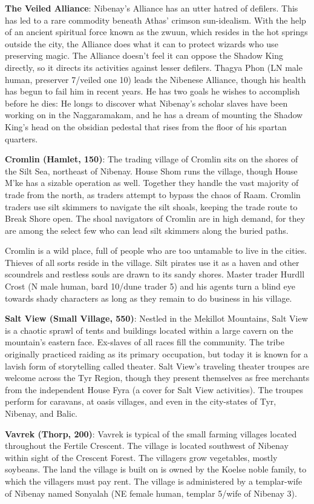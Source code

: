 {	\textbf{The Veiled Alliance}: Nibenay's Alliance has an utter hatred of defilers. This has led to a rare commodity beneath Athas' crimson sun-idealism. With the help of an ancient spiritual force known as the zwuun, which resides in the hot springs outside the city, the Alliance does what it can to protect wizards who use preserving magic. The Alliance doesn't feel it can oppose the Shadow King directly, so it directs its activities against lesser defilers. Thagya Phon (LN male human, preserver 7/veiled one 10) leads the Nibenese Alliance, though his health has begun to fail him in recent years. He has two goals he wishes to accomplish before he dies: He longs to discover what Nibenay's scholar slaves have been working on in the Naggaramakam, and he has a dream of mounting the Shadow King's head on the obsidian pedestal that rises from the floor of his spartan quarters.
}
{
	\textbf{Cromlin (Hamlet, 150)}: The trading village of Cromlin sits on the shores of the Silt Sea, northeast of Nibenay. House Shom runs the village, though House M'ke has a sizable operation as well. Together they handle the vast majority of trade from the north, as traders attempt to bypass the chaos of Raam. Cromlin traders use silt skimmers to navigate the silt shoals, keeping the trade route to Break Shore open. The shoal navigators of Cromlin are in high demand, for they are among the select few who can lead silt skimmers along the buried paths.

	Cromlin is a wild place, full of people who are too untamable to live in the cities. Thieves of all sorts reside in the village. Silt pirates use it as a haven and other scoundrels and restless souls are drawn to its sandy shores. Master trader Hurdll Crost (N male human, bard 10/dune trader 5) and his agents turn a blind eye towards shady characters as long as they remain to do business in his village.

	\textbf{Salt View (Small Village, 550)}: Nestled in the Mekillot Mountains, Salt View is a chaotic sprawl of tents and buildings located within a large cavern on the mountain's eastern face. Ex-slaves of all races fill the community. The tribe originally practiced raiding as its primary occupation, but today it is known for a lavish form of storytelling called theater. Salt View's traveling theater troupes are welcome across the Tyr Region, though they present themselves as free merchants from the independent House Fyra (a cover for Salt View activities). The troupes perform for caravans, at oasis villages, and even in the city-states of Tyr, Nibenay, and Balic.

	\textbf{Vavrek (Thorp, 200)}: Vavrek is typical of the small farming villages located throughout the Fertile Crescent. The village is located southwest of Nibenay within sight of the Crescent Forest. The villagers grow vegetables, mostly soybeans. The land the village is built on is owned by the Koelse noble family, to which the villagers must pay rent. The village is administered by a templar-wife of Nibenay named Sonyalah (NE female human, templar 5/wife of Nibenay 3).
}

